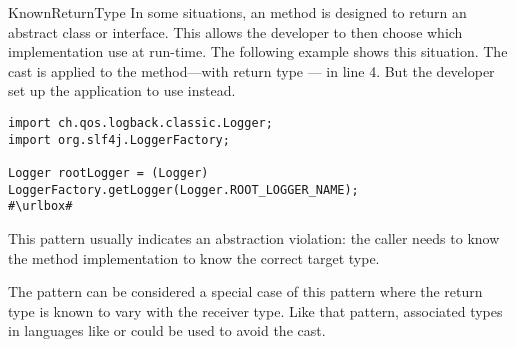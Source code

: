 \begin{pattern}{KnownReturnType}
In some situations,
an \api{} method is designed to return an abstract class or interface.
This \api{} allows the developer to then choose which implementation use at run-time.
The following example shows this situation.
The cast is applied to the  method---with return type --- in line 4.
But the developer set up the application to use  instead.

\def\urlvar{http://bit.ly/skylot_jadx_2HIoR9X}
\begin{verbatim}
import ch.qos.logback.classic.Logger;
import org.slf4j.LoggerFactory;

Logger rootLogger = (Logger) LoggerFactory.getLogger(Logger.ROOT_LOGGER_NAME);
#\urlbox#
\end{verbatim}


\issues{}
This pattern usually indicates an abstraction violation:
the caller needs to know the method implementation to know the correct target type.

The  pattern can be considered a special case of this pattern where the return type is known to vary with the receiver type.
Like that pattern,
associated types~\citep{chakravartyAssociatedTypeSynonyms2005}
in languages like \haskell{} or \rust{} could be used to avoid the cast.

\end{pattern}